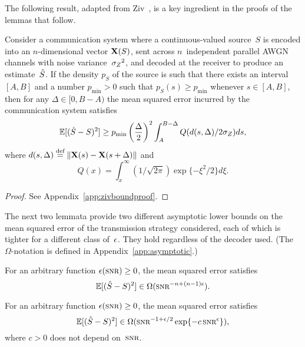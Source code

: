 The following result, adapted from Ziv~\cite{Ziv1970}, is a key ingredient in
the proofs of the lemmas that follow.

\begin{lemma}
  \label{lem:zivbound}
  Consider a communication system where a con\-tin\-u\-ous-valued source~$S$ is
  encoded into an $n$-dimensional vector $\mathbf{X}(S)$, sent across $n$~independent
  parallel AWGN channels with noise variance~${{\sigma_Z}^2}$, and decoded at the receiver
  to produce an estimate~${\hat{S}}$.  If the density $p_S$ of the source is such that
  there exists an interval $[A,B]$ and a number $p_{\min} > 0$ such that $p_S(s)
  \ge p_{\min}$ whenever $s \in [A,B]$, then for any $\Delta \in [0,B-A)$ the
  mean squared error incurred by the communication system satisfies
  \begin{equation}
    \label{eq:zivbound}
    \mathbb{E}[({\hat{S}} - S)^2] \ge p_{\min} \left(\frac{\Delta}{2} \right)^2 
    \int_A^{B-\Delta} Q(d(s, \Delta) / 2 {\sigma_Z}) ds,
  \end{equation}
  where $d(s, \Delta) \stackrel{\text{def}}{=} \|\mathbf{X}(s) - \mathbf{X}(s+\Delta)\|$ and 
  \[Q(x) = \int_x^{\infty} (1/\sqrt{2\pi}) \exp\{-\xi^2/2\} d\xi.\]
\end{lemma}

\begin{proof}
  See Appendix~\ref{app:zivboundproof}.
\end{proof}

The next two lemmata provide two different asymptotic lower bounds on the
mean squared error of the transmission strategy considered, each of which is
tighter for a different class of~$\epsilon$. They hold regardless of the decoder used.
(The $\Omega$-notation is defined in Appendix~\ref{app:asymptotic}.)

\begin{lemma}
  \label{lem:lowerbound1}
  For an arbitrary function $\e(\snr) \ge 0$, the mean squared error satisfies
  \begin{equation*}
    \mse \in \Omega(\snr^{-n + (n-1)\e}).
  \end{equation*}
\end{lemma}

\begin{lemma}
  \label{lem:lowerbound2}
  For an arbitrary function $\e(\snr) \ge 0$, the mean squared error
  satisfies
  \begin{equation*}
    \mse \in \Omega(\snr^{-1+\e/2} \exp\{-c\snr^\e\}),
  \end{equation*}
  where $c>0$ does not depend on~$\snr$.
\end{lemma}

